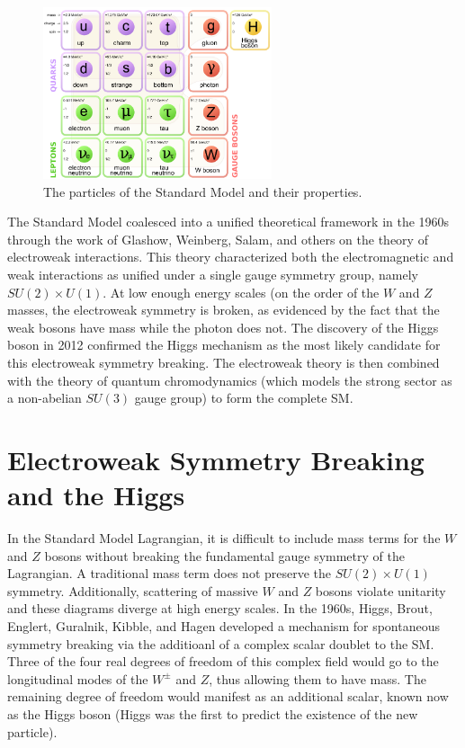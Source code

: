\begin{figure}[h!]
  \centering
  \captionsetup{justification=centering}

  \includegraphics[width=0.6\textwidth]{figures/SM_particles}
  \caption{The particles of the Standard Model and their properties\cite{PDG}.}
  \label{fig:sm_particles}
\end{figure}

The Standard Model coalesced into a unified theoretical framework in the 1960s through the work of Glashow, Weinberg, Salam, and others on the theory of electroweak interactions\cite{Glashow, Weinberg, Salam, Glashow2}. This theory characterized both the electromagnetic and weak interactions as unified under a single gauge symmetry group, namely $SU(2) \times U(1)$. At low enough energy scales (on the order of the $W$ and $Z$ masses, the electroweak symmetry is broken, as evidenced by the fact that the weak bosons have mass while the photon does not. The discovery of the Higgs boson in 2012 confirmed the Higgs mechanism as the most likely candidate for this electroweak symmetry breaking\cite{Discovery, CMSDiscovery}. The electroweak theory is then combined with the theory of quantum chromodynamics (which models the strong sector as a non-abelian $SU(3)$ gauge group) to form the complete SM\cite{QCDBook}. 

\section{Electroweak Symmetry Breaking and the Higgs}

In the Standard Model Lagrangian, it is difficult to include mass terms for the $W$ and $Z$ bosons without breaking the fundamental gauge symmetry of the Lagrangian. A traditional mass term does not preserve the $SU(2) \times U(1)$ symmetry. Additionally, scattering of massive $W$ and $Z$ bosons violate unitarity and these diagrams diverge at high energy scales. In the 1960s, Higgs, Brout, Englert, Guralnik, Kibble, and Hagen developed a mechanism for spontaneous symmetry breaking via the additioanl of a complex scalar doublet to the SM. Three of the four real degrees of freedom of this complex field would go to the longitudinal modes of the $W^{\pm}$ and $Z$, thus allowing them to have mass\cite{Higgs1,Higgs2,Englert,Guralnik}. The remaining degree of freedom would manifest as an additional scalar, known now as the Higgs boson (Higgs was the first to predict the existence of the new particle). 

